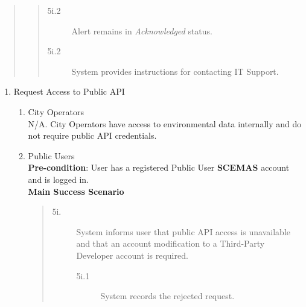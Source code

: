 \documentclass[]{article}
\begin{document}
\begin{enumerate}[{\bf BE6.}]
\begin{quote}
\begin{quote}
\begin{description}
\begin{description}
                            \item[\textmd{5i.2}] Alert remains in \textit{Acknowledged} status.
                            \item[\textmd{5i.2}] System provides instructions for contacting IT Support.
                        \end{description}
                    \end{description}
                \end{quote}
        	\end{quote}
\end{enumerate}

\begin{enumerate}[{\bf BE7.}]
    \item Request Access to Public API
        \begin{enumerate}[{\bf VP1.}]
            \item City Operators \\
                N/A. City Operators have access to environmental data internally and do not require public API credentials.

            \item Public Users \\
                \textbf{Pre-condition}: User has a registered Public User \textbf{SCEMAS} account and is logged in.\\
                \textbf{Main Success Scenario}
                \begin{quote}
                    \begin{description}
                        \item[\textmd{5i.}] System informs user that public API access is unavailable and that an account modification to a Third-Party Developer account is required.
                        \begin{description}
                            \item[\textmd{5i.1}] System records the rejected request.
                        \end{description}
                    \end{description}
                \end{quote}


\end{enumerate}
\end{enumerate}
\end{document}
